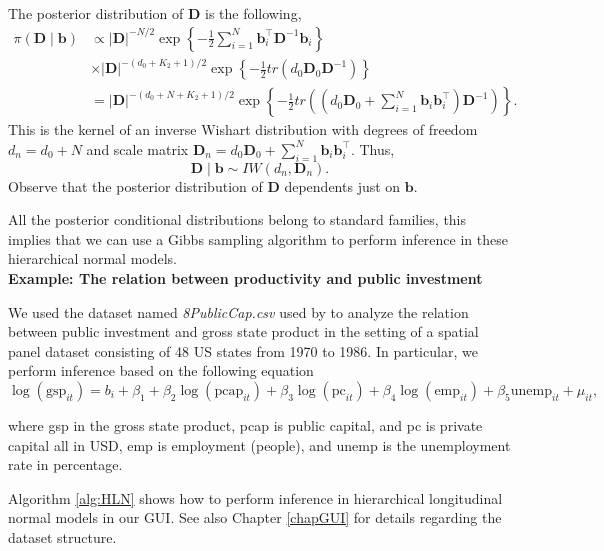 The posterior distribution of $\bm{D}$ is the following,
\begin{align*}
	\pi(\bm{D}\mid \bm{b})&\propto  |\bm{D}|^{-N/2} \exp\left\{-\frac{1}{2}\sum_{i=1}^N \bm{b}_i^{\top}\bm{D}^{-1}\bm{b}_i\right\}\\
	&\times |\bm{D}|^{-(d_0+K_2+1)/2}\exp\left\{-\frac{1}{2}tr(d_0\bm{D}_0\bm{D}^{-1})\right\}\\
	&=|\bm{D}|^{-(d_0+N+K_2+1)/2}\exp\left\{-\frac{1}{2}tr\left(\left(d_0\bm{D}_0+\sum_{i=1}^N\bm{b}_i\bm{b}_i^{\top}\right)\bm{D}^{-1}\right) \right\}. 
\end{align*}
This is the kernel of an inverse Wishart distribution with degrees of freedom $d_n=d_0+N$ and scale matrix $\bm{D}_n=d_0\bm{D}_0+\sum_{i=1}^N\bm{b}_i\bm{b}_i^{\top}$. Thus,   
\begin{equation*}
	\bm{D}\mid  \bm{b} \sim {I}{W}(d_n, \bm{D}_n).
\end{equation*}
Observe that the posterior distribution of $\bm{D}$ dependents just on $\bm{b}$. 

All the posterior conditional distributions belong to standard families, this implies that we can use a Gibbs sampling algorithm to perform inference in these hierarchical normal models.\\

\textbf{Example: The relation between productivity and public investment}

We used the dataset named \textit{8PublicCap.csv} used by \cite{Ramirez2017} to analyze the relation  between public investment and gross state product in the setting of a spatial panel dataset consisting of 48 US states from 1970 to 1986.
In particular, we perform inference based on the following equation 
\begin{equation*}
	\log(\text{gsp}_{it})=b_i+\beta_1+\beta_2\log(\text{pcap}_{it})+\beta_3\log(\text{pc}_{it})+\beta_4\log(\text{emp}_{it})+\beta_5\text{unemp}_{it}+\mu_{it},
\end{equation*}

where gsp in the gross state product, pcap is public capital, and pc is private capital all in USD, emp is employment (people), and unemp is the unemployment rate in percentage.

Algorithm \ref{alg:HLN} shows how to perform inference in hierarchical longitudinal normal models in our GUI. See also Chapter \ref{chapGUI} for details regarding the dataset structure.

